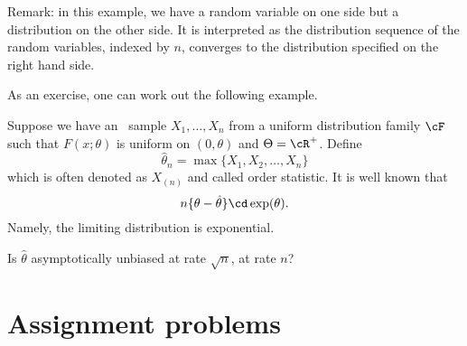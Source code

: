 Remark: in this example, we have a random variable on one side
but a distribution on the other side. It is interpreted as the distribution
sequence of the random variables, indexed by $n$, converges to the
distribution specified on the right hand side.

As an exercise, one can work out the following example.

\begin{example}
Suppose we have an \iid\ sample $X_1, \ldots, X_n$ from a
uniform distribution family $\cF$ such that 
$F(x; \theta)$ is uniform on $(0, \theta)$ and 
$\Theta = \cR^+$.
Define
\[
\hat \theta_n = \max\{X_1, X_2, \ldots, X_n\}
\]
which is often denoted as $X_{(n)}$ and called order statistic.
It is well known that
\[
n \{ \theta - \hat \theta \} \cd \exp ( \theta).
\]
Namely, the limiting distribution is exponential.

Is $\hat \theta$ asymptotically unbiased at rate $\sqrt{n}$, at rate $n$?
\end{example}

\section{Assignment problems}

